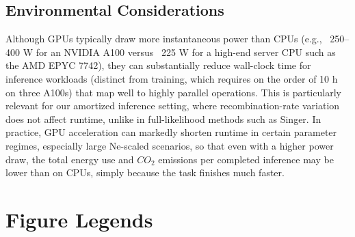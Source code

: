 \documentclass[9pt,twocolumn,twoside]{pnas-new}
\begin{document}
{\subsection*{Environmental Considerations}
Although GPUs typically draw more instantaneous power than CPUs 
(e.g., ~250–400 W for an NVIDIA A100 versus ~225 W for a high-end server CPU such as the AMD EPYC 7742),
they can substantially reduce wall-clock time for inference workloads 
(distinct from training, which requires on the order of 10 h on three A100s) 
that map well to highly parallel operations. 
This is particularly relevant for our amortized inference setting, 
where recombination-rate variation does not affect runtime, 
unlike in full-likelihood methods such as Singer. 
In practice, GPU acceleration can markedly shorten runtime in certain parameter regimes, especially large Ne-scaled scenarios, so that even with a higher power draw, 
the total energy use and $CO_{2}$ emissions per completed inference may be lower than on CPUs,
simply because the task finishes much faster.

}

\showmatmethods{}



\showacknow{}




\newpage
\section*{Figure Legends}
\end{document}
